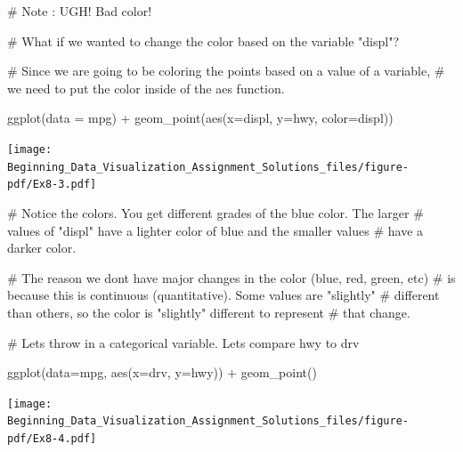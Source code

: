 \documentclass[
  letterpaper,
  DIV=11,
  numbers=noendperiod]{scrreprt}
\newenvironment{Shaded}{\begin{snugshade}}{\end{snugshade}}
\newcommand{\AttributeTok}[1]{\textcolor[rgb]{0.40,0.45,0.13}{#1}}
\newcommand{\CommentTok}[1]{\textcolor[rgb]{0.37,0.37,0.37}{#1}}
\newcommand{\FunctionTok}[1]{\textcolor[rgb]{0.28,0.35,0.67}{#1}}
\newcommand{\NormalTok}[1]{\textcolor[rgb]{0.00,0.23,0.31}{#1}}
\newcommand{\SpecialCharTok}[1]{\textcolor[rgb]{0.37,0.37,0.37}{#1}}
\begin{document}
\begin{Shaded}
\begin{Highlighting}[]
\CommentTok{\# Note : UGH! Bad color!}

\CommentTok{\# What if we wanted to change the color based on the variable "displ"? }

\CommentTok{\# Since we are going to be coloring the points based on a value of a variable,}
\CommentTok{\# we need to put the color inside of the \textasciigrave{}aes\textasciigrave{} function.}

\FunctionTok{ggplot}\NormalTok{(}\AttributeTok{data =}\NormalTok{ mpg) }\SpecialCharTok{+} 
  \FunctionTok{geom\_point}\NormalTok{(}\FunctionTok{aes}\NormalTok{(}\AttributeTok{x=}\NormalTok{displ, }\AttributeTok{y=}\NormalTok{hwy, }\AttributeTok{color=}\NormalTok{displ))}
\end{Highlighting}
\end{Shaded}

\texttt{[image: Beginning\_Data\_Visualization\_Assignment\_Solutions\_files/figure-pdf/Ex8-3.pdf]}

\begin{Shaded}
\begin{Highlighting}[]
\CommentTok{\# Notice the colors. You get different grades of the blue color. The larger}
\CommentTok{\# values of "displ" have a lighter color of blue and the smaller values }
\CommentTok{\# have a darker color. }

\CommentTok{\# The reason we don\textquotesingle{}t have major changes in the color (blue, red, green, etc)}
\CommentTok{\# is because this is continuous (quantitative). Some values are "slightly" }
\CommentTok{\# different than others, so the color is "slightly" different to represent }
\CommentTok{\# that change.}

\CommentTok{\# Let\textquotesingle{}s throw in a categorical variable. Let\textquotesingle{}s compare hwy to drv}

\FunctionTok{ggplot}\NormalTok{(}\AttributeTok{data=}\NormalTok{mpg, }\FunctionTok{aes}\NormalTok{(}\AttributeTok{x=}\NormalTok{drv, }\AttributeTok{y=}\NormalTok{hwy)) }\SpecialCharTok{+}
  \FunctionTok{geom\_point}\NormalTok{()}
\end{Highlighting}
\end{Shaded}

\texttt{[image: Beginning\_Data\_Visualization\_Assignment\_Solutions\_files/figure-pdf/Ex8-4.pdf]}
\end{document}
